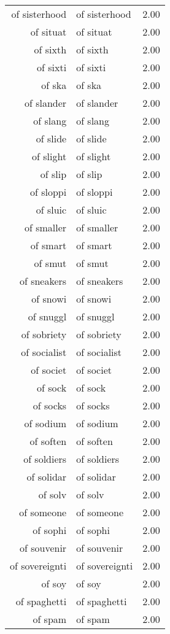 \begin{table}[ht]
\begin{tabular}{rlr}
  of sisterhood & of sisterhood & 2.00 \\ 
  of situat & of situat & 2.00 \\ 
  of sixth & of sixth & 2.00 \\ 
  of sixti & of sixti & 2.00 \\ 
  of ska & of ska & 2.00 \\ 
  of slander & of slander & 2.00 \\ 
  of slang & of slang & 2.00 \\ 
  of slide & of slide & 2.00 \\ 
  of slight & of slight & 2.00 \\ 
  of slip & of slip & 2.00 \\ 
  of sloppi & of sloppi & 2.00 \\ 
  of sluic & of sluic & 2.00 \\ 
  of smaller & of smaller & 2.00 \\ 
  of smart & of smart & 2.00 \\ 
  of smut & of smut & 2.00 \\ 
  of sneakers & of sneakers & 2.00 \\ 
  of snowi & of snowi & 2.00 \\ 
  of snuggl & of snuggl & 2.00 \\ 
  of sobriety & of sobriety & 2.00 \\ 
  of socialist & of socialist & 2.00 \\ 
  of societ & of societ & 2.00 \\ 
  of sock & of sock & 2.00 \\ 
  of socks & of socks & 2.00 \\ 
  of sodium & of sodium & 2.00 \\ 
  of soften & of soften & 2.00 \\ 
  of soldiers & of soldiers & 2.00 \\ 
  of solidar & of solidar & 2.00 \\ 
  of solv & of solv & 2.00 \\ 
  of someone & of someone & 2.00 \\ 
  of sophi & of sophi & 2.00 \\ 
  of souvenir & of souvenir & 2.00 \\ 
  of sovereignti & of sovereignti & 2.00 \\ 
  of soy & of soy & 2.00 \\ 
  of spaghetti & of spaghetti & 2.00 \\ 
  of spam & of spam & 2.00 \\ 

\end{tabular}
\end{table}
